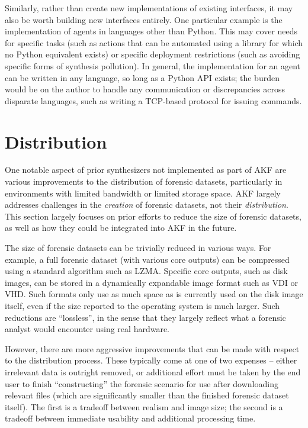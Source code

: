 \documentclass[letterpaper,12pt]{report}
\begin{document}
Similarly, rather than create new implementations of existing
interfaces, it may also be worth building new interfaces entirely. One
particular example is the implementation of agents in languages other
than Python. This may cover needs for specific tasks (such as actions
that can be automated using a library for which no Python equivalent
exists) or specific deployment restrictions (such as avoiding specific
forms of synthesis pollution). In general, the implementation for an
agent can be written in any language, so long as a Python API exists;
the burden would be on the author to handle any communication or
discrepancies across disparate languages, such as writing a TCP-based
protocol for issuing commands.

\section{Distribution}\label{distribution}

One notable aspect of prior synthesizers not implemented as part of AKF
are various improvements to the distribution of forensic datasets,
particularly in environments with limited bandwidth or limited storage
space. AKF largely addresses challenges in the \emph{creation} of
forensic datasets, not their \emph{distribution}. This section largely
focuses on prior efforts to reduce the size of forensic datasets, as
well as how they could be integrated into AKF in the future.

The size of forensic datasets can be trivially reduced in various ways.
For example, a full forensic dataset (with various core outputs) can be
compressed using a standard algorithm such as LZMA. Specific core
outputs, such as disk images, can be stored in a dynamically expandable
image format such as VDI or VHD. Such formats only use as much space as
is currently used on the disk image itself, even if the size reported to
the operating system is much larger. Such reductions are ``lossless'',
in the sense that they largely reflect what a forensic analyst would
encounter using real hardware.

However, there are more aggressive improvements that can be made with
respect to the distribution process. These typically come at one of two
expenses -- either irrelevant data is outright removed, or additional
effort must be taken by the end user to finish ``constructing'' the
forensic scenario for use after downloading relevant files (which are
significantly smaller than the finished forensic dataset itself). The
first is a tradeoff between realism and image size; the second is a
tradeoff between immediate usability and additional processing time.
\end{document}
